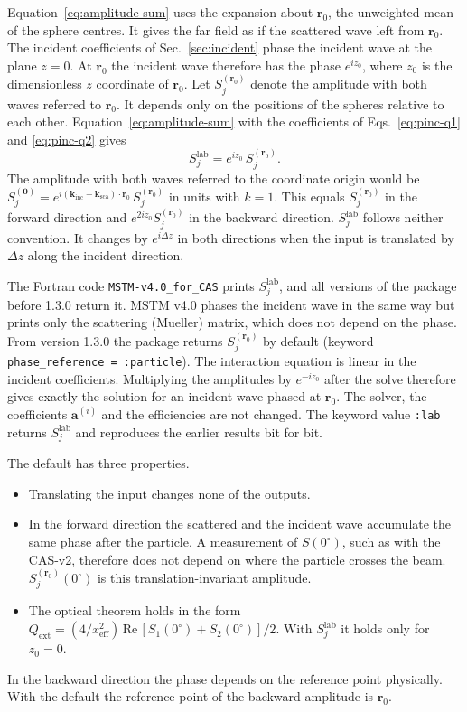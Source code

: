 \documentclass[11pt,a4paper]{article}
\begin{document}
Equation~\eqref{eq:amplitude-sum} uses the expansion about $\bm{r}_0$, the unweighted mean of the sphere centres.
It gives the far field as if the scattered wave left from $\bm{r}_0$.
The incident coefficients of Sec.~\ref{sec:incident} phase the incident wave at the plane $z = 0$.
At $\bm{r}_0$ the incident wave therefore has the phase $e^{iz_0}$, where $z_0$ is the dimensionless $z$ coordinate of $\bm{r}_0$.
Let $S_j^{(\bm{r}_0)}$ denote the amplitude with both waves referred to $\bm{r}_0$.
It depends only on the positions of the spheres relative to each other.
Equation~\eqref{eq:amplitude-sum} with the coefficients of Eqs.~\eqref{eq:pinc-q1} and \eqref{eq:pinc-q2} gives
\begin{equation}
  S_j^\mathrm{lab} = e^{iz_0}\, S_j^{(\bm{r}_0)} .
  \label{eq:phase-lab}
\end{equation}
The amplitude with both waves referred to the coordinate origin would be
$S_j^{(\bm{0})} = e^{i(\bm{k}_\mathrm{inc} - \bm{k}_\mathrm{sca})\cdot\bm{r}_0}\, S_j^{(\bm{r}_0)}$ in units with $k = 1$.
This equals $S_j^{(\bm{r}_0)}$ in the forward direction and $e^{2iz_0} S_j^{(\bm{r}_0)}$ in the backward direction.
$S_j^\mathrm{lab}$ follows neither convention.
It changes by $e^{i\Delta z}$ in both directions when the input is translated by $\Delta z$ along the incident direction.

The Fortran code \texttt{MSTM-v4.0\_for\_CAS} prints $S_j^\mathrm{lab}$, and all versions of the package before 1.3.0 return it.
MSTM v4.0 phases the incident wave in the same way but prints only the scattering (Mueller) matrix, which does not depend on the phase.
From version 1.3.0 the package returns $S_j^{(\bm{r}_0)}$ by default (keyword \texttt{phase\_reference = :particle}).
The interaction equation is linear in the incident coefficients.
Multiplying the amplitudes by $e^{-iz_0}$ after the solve therefore gives exactly the solution for an incident wave phased at $\bm{r}_0$.
The solver, the coefficients $\bm{a}^{(i)}$ and the efficiencies are not changed.
The keyword value \texttt{:lab} returns $S_j^\mathrm{lab}$ and reproduces the earlier results bit for bit.

The default has three properties.
\begin{itemize}[nosep]
  \item Translating the input changes none of the outputs.
  \item In the forward direction the scattered and the incident wave accumulate the same phase after the particle.
  A measurement of $S(0^\circ)$, such as with the CAS-v2, therefore does not depend on where the particle crosses the beam.
  $S_j^{(\bm{r}_0)}(0^\circ)$ is this translation-invariant amplitude.
  \item The optical theorem holds in the form
  $Q_\mathrm{ext} = (4/x_\mathrm{eff}^2)\,\mathrm{Re}\,[S_1(0^\circ) + S_2(0^\circ)]/2$.
  With $S_j^\mathrm{lab}$ it holds only for $z_0 = 0$.
\end{itemize}
In the backward direction the phase depends on the reference point physically.
With the default the reference point of the backward amplitude is $\bm{r}_0$.
\end{document}

